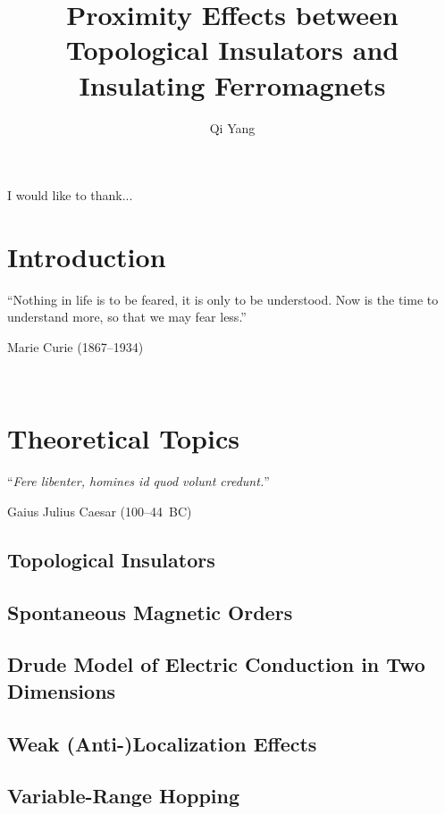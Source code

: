 ﻿\documentclass{report}
\begin{document}
\title{Proximity Effects between Topological Insulators and Insulating Ferromagnets}
\author{Qi Yang}

\keepXColumns

\beforepreface
%

    

    I would like to thank...
\afterpreface
\captionsetup{width=0.95\columnwidth}%

\chapter{Introduction}\label{ch:intro}
\epigraph{``Nothing in life is to be feared, it is only to be understood. Now is the time to understand more, so that we may fear less.''}{Marie Curie (1867--1934)}~\\
\begin{refsection}
    
    \printbibliography[heading=subbibintoc, title=References]
\end{refsection}	

\chapter{Theoretical Topics}\label{ch:theory}
\begin{refsection} 
\epigraph{``\textit{Fere libenter, homines id quod volunt credunt.}''}{Gaius Julius Caesar (100--44~BC)}
    \section{Topological Insulators}\label{sec:ti}
        
    \section{Spontaneous Magnetic Orders}\label{sec:magnetism}
        
    \section{Drude Model of Electric Conduction in Two Dimensions}\label{sec:drude}
        
    \section{Weak (Anti-)Localization Effects}\label{sec:wl}
        
    \section{Variable-Range Hopping}\label{sec:vrh}
        
    \printbibliography[heading=subbibintoc, title=References]
\end{refsection}	
\end{document}
